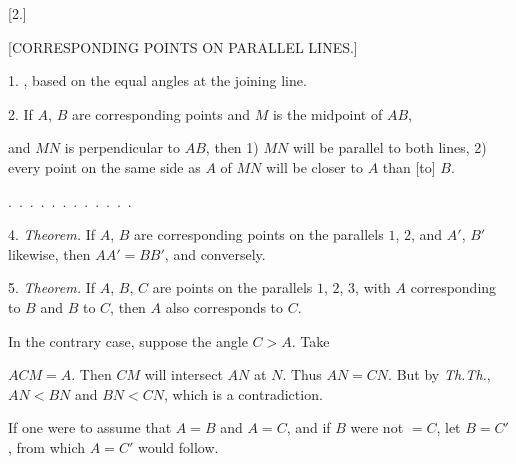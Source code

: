 \begin{center}[2.]\end{center}

\begin{center}[CORRESPONDING POINTS ON PARALLEL LINES.]\end{center}

1. \emph{} , based on the equal angles at the joining line.

2. If $A$, $B$ are corresponding points and $M$ is the midpoint of $AB$,

\begin{center}

\end{center}
\noindent and $MN$ is perpendicular to $AB$, then 1) $MN$ will be parallel to both lines, 2) every point on the same side as $A$ of $MN$ will be closer to $A$ than [to] $B$.

.\ .\ .\ .\ .\ .\ .\ .\ .\ .\ .\ . 

4. \emph{Theorem.} If $A$, $B$ are corresponding points on the parallels $1$, $2$, and $A'$, $B'$ likewise, then $AA' = BB'$, and conversely.

5. \emph{Theorem.} If $A$, $B$, $C$ are points on the parallels $1$, $2$, $3$, with $A$ corresponding to $B$ and $B$ to $C$, then $A$ also corresponds to $C$.

 In the contrary case, suppose the angle $C > A$. Take

\begin{center}

\end{center}
\noindent $ACM = A$. Then $CM$ will intersect $AN$ at $N$. Thus $AN = CN$. But by \emph{Th.Th.}, $AN < BN$ and $BN < CN$, which is a contradiction.

If one were to assume that $A = B$ and $A = C$, and if $B$ were not $= C$, let $B = C'$, from which $A = C'$ would follow.

